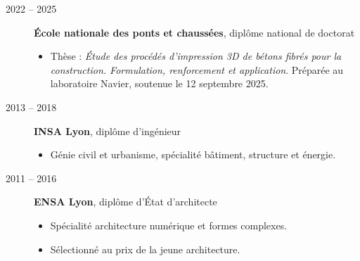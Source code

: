 \documentclass[11pt,a4paper]{article}
\begin{document}
\begin{description}
  \item[2022 -- 2025] \textbf{École nationale des ponts et chaussées}, diplôme national de doctorat
  \begin{itemize}
    \item Thèse : \emph{Étude des procédés d'impression 3D de bétons fibrés pour la construction. Formulation, renforcement et application}. Préparée au laboratoire Navier, soutenue le 12 septembre 2025.
  \end{itemize}

  \item[2013 -- 2018] \textbf{INSA Lyon}, diplôme d'ingénieur
  \begin{itemize}
    \item Génie civil et urbanisme, spécialité bâtiment, structure et énergie.
  \end{itemize}

  \item[2011 -- 2016] \textbf{ENSA Lyon}, diplôme d'État d'architecte
  \begin{itemize}
    \item Spécialité architecture numérique et formes complexes.
    \item Sélectionné au prix de la jeune architecture.
  \end{itemize}
\end{description}

\end{document}
